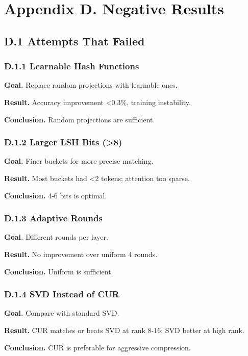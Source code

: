 
\section{Appendix D. Negative Results}

\subsection{D.1 Attempts That Failed}

\subsubsection{D.1.1 Learnable Hash Functions}

\textbf{Goal.} Replace random projections with learnable ones.

\textbf{Result.} Accuracy improvement \textless{}0.3\%, training instability.

\textbf{Conclusion.} Random projections are sufficient.

\subsubsection{D.1.2 Larger LSH Bits (\textgreater{}8)}

\textbf{Goal.} Finer buckets for more precise matching.

\textbf{Result.} Most buckets had \textless{}2 tokens; attention too sparse.

\textbf{Conclusion.} 4-6 bits is optimal.

\subsubsection{D.1.3 Adaptive Rounds}

\textbf{Goal.} Different rounds per layer.

\textbf{Result.} No improvement over uniform 4 rounds.

\textbf{Conclusion.} Uniform is sufficient.

\subsubsection{D.1.4 SVD Instead of CUR}

\textbf{Goal.} Compare with standard SVD.

\textbf{Result.} CUR matches or beats SVD at rank 8-16; SVD better at high rank.

\textbf{Conclusion.} CUR is preferable for aggressive compression.

